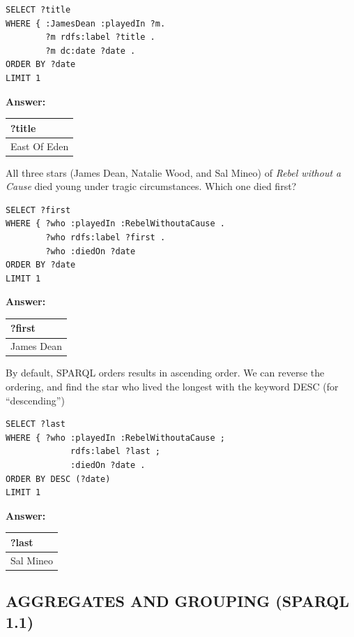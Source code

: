
\begin{lstlisting}
SELECT ?title
WHERE { :JamesDean :playedIn ?m.
        ?m rdfs:label ?title .
        ?m dc:date ?date . 
ORDER BY ?date
LIMIT 1
\end{lstlisting}

\textbf{\textbf{Answer:}}

\begin{tabular}{|l|}
\hline
?title\\
\hline
East Of Eden\\
\hline
\end{tabular}

All three stars (James Dean, Natalie Wood, and Sal Mineo) of \emph{Rebel
without a Cause} died young under tragic circumstances. Which one died
first?


\begin{lstlisting}
SELECT ?first
WHERE { ?who :playedIn :RebelWithoutaCause .
        ?who rdfs:label ?first .
        ?who :diedOn ?date
ORDER BY ?date
LIMIT 1
\end{lstlisting}


\textbf{\textbf{Answer:}}

\begin{tabular}{|l|}
\hline
?first\\
\hline
James Dean\\
\hline
\end{tabular}

By default, SPARQL orders results in ascending order. We can reverse the
ordering, and find the star who lived the longest with the keyword DESC
(for ``descending'')


\begin{lstlisting}
SELECT ?last
WHERE { ?who :playedIn :RebelWithoutaCause ;
             rdfs:label ?last ;
             :diedOn ?date .
ORDER BY DESC (?date)
LIMIT 1
\end{lstlisting}

\textbf{\textbf{Answer:}}

\begin{tabular}{|l|}
\hline
?last\\
\hline
Sal Mineo\\
\hline
\end{tabular}

\subsection{AGGREGATES AND GROUPING (SPARQL 1.1)}

